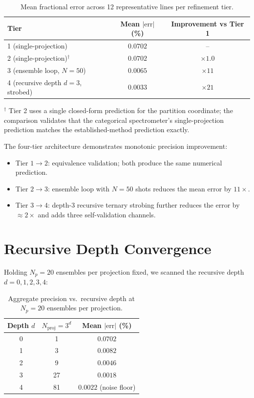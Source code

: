 \documentclass[11pt,a4paper]{article}
\theoremstyle{thmstyle}
\theoremstyle{axiomstyle}
\theoremstyle{definition}
\theoremstyle{remark}
\begin{document}
\begin{table}[H]
\centering
\caption{Mean fractional error across 12 representative lines per refinement tier.}
\label{tab:tier_summary}
\begin{tabular}{lcc}
\toprule
Tier & Mean $|\mathrm{err}|$ (\%) & Improvement vs Tier 1\\
\midrule
1 (single-projection) & $0.0702$ & --\\
2 (single-projection)$^{\dagger}$ & $0.0702$ & $\times 1.0$\\
3 (ensemble loop, $N=50$) & $0.0065$ & $\times 11$\\
4 (recursive depth $d=3$, strobed) & $0.0033$ & $\times 21$\\
\bottomrule
\end{tabular}
\end{table}
\noindent$^{\dagger}$ Tier 2 uses a single closed-form prediction for the partition coordinate; the comparison validates that the categorical spectrometer's single-projection prediction matches the established-method prediction exactly.

The four-tier architecture demonstrates monotonic precision improvement:
\begin{itemize}[nosep]
\item Tier $1\to 2$: equivalence validation; both produce the same numerical prediction.
\item Tier $2\to 3$: ensemble loop with $N=50$ shots reduces the mean error by $11\times$.
\item Tier $3\to 4$: depth-3 recursive ternary strobing further reduces the error by $\approx 2\times$ and adds three self-validation channels.
\end{itemize}

\section{Recursive Depth Convergence}
\label{sec:depth_results}

Holding $N_{p}=20$ ensembles per projection fixed, we scanned the recursive depth $d=0,1,2,3,4$:

\begin{table}[H]
\centering
\caption{Aggregate precision vs.\ recursive depth at $N_{p}=20$ ensembles per projection.}
\label{tab:depth}
\begin{tabular}{ccc}
\toprule
Depth $d$ & $N_{\mathrm{proj}}=3^{d}$ & Mean $|\mathrm{err}|$ (\%)\\
\midrule
0 & 1 & $0.0702$\\
1 & 3 & $0.0082$\\
2 & 9 & $0.0046$\\
3 & 27 & $0.0018$\\
4 & 81 & $0.0022$ (noise floor)\\
\bottomrule
\end{tabular}
\end{table}
\end{document}
